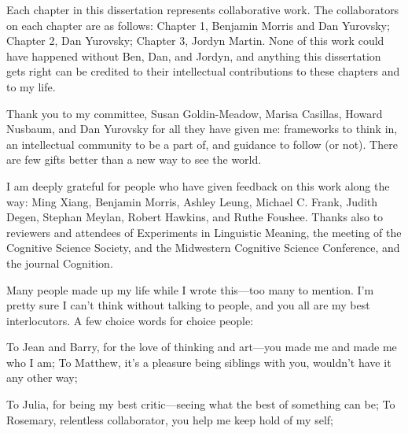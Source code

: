 \documentclass{ucetd}
\date{August 2023}
\title{\thesistitle}
\author{\thesisauthor}
\begin{document}
\maketitle



\newpage
{}
\tableofcontents
{}
\newpage
{}
\listoffigures
\newpage
{}
\listoftables
\newpage

\acknowledgments
Each chapter in this dissertation represents collaborative work. The collaborators on each chapter are as follows: Chapter 1, Benjamin Morris and Dan Yurovsky; Chapter 2, Dan Yurovsky; Chapter 3, Jordyn Martin. None of this work could have happened without Ben, Dan, and Jordyn, and anything this dissertation gets right can be credited to their intellectual contributions to these chapters and to my life.

Thank you to my committee, Susan Goldin-Meadow, Marisa Casillas, Howard Nusbaum, and Dan Yurovsky for all they have given me: frameworks to think in, an intellectual community to be a part of, and guidance to follow (or not). There are few gifts better than a new way to see the world.

I am deeply grateful for people who have given feedback on this work along the way: Ming Xiang, Benjamin Morris, Ashley Leung, Michael C. Frank, Judith Degen, Stephan Meylan, Robert Hawkins, and Ruthe Foushee. Thanks also to reviewers and attendees of Experiments in Linguistic Meaning, the meeting of the Cognitive Science Society, and the Midwestern Cognitive Science Conference, and the journal Cognition.

Many people made up my life while I wrote this—too many to mention. I'm pretty sure I can't think without talking to people, and you all are my best interlocutors. A few choice words for choice people:

To Jean and Barry, for the love of thinking and art—you made me and made me who I am; To Matthew, it's a pleasure being siblings with you, wouldn't have it any other way;

To Julia, for being my best critic—seeing what the best of something can be; To Rosemary, relentless collaborator, you help me keep hold of my self;
\end{document}
